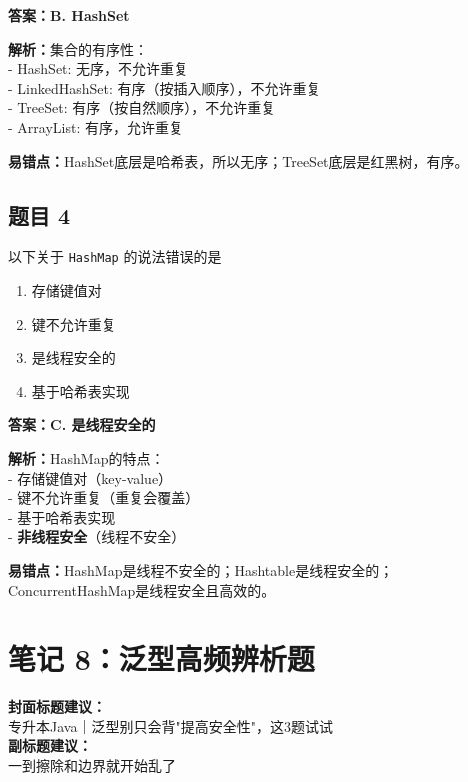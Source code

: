 \documentclass[12pt,a4paper]{ctexart}
\begin{document}
\begin{answerbox}
	\textbf{答案：B. HashSet}

	\textbf{解析：}集合的有序性：\\
	- HashSet: 无序，不允许重复\\
	- LinkedHashSet: 有序（按插入顺序），不允许重复\\
	- TreeSet: 有序（按自然顺序），不允许重复\\
	- ArrayList: 有序，允许重复

	\textbf{易错点：}HashSet底层是哈希表，所以无序；TreeSet底层是红黑树，有序。
\end{answerbox}

\subsection*{题目 4}
以下关于 \texttt{HashMap} 的说法错误的是
\begin{enumerate}[label=\Alph*.]
	\item 存储键值对
	\item 键不允许重复
	\item 是线程安全的
	\item 基于哈希表实现
\end{enumerate}

\begin{answerbox}
	\textbf{答案：C. 是线程安全的}

	\textbf{解析：}HashMap的特点：\\
	- 存储键值对（key-value）\\
	- 键不允许重复（重复会覆盖）\\
	- 基于哈希表实现\\
	- \textbf{非线程安全}（线程不安全）

	\textbf{易错点：}HashMap是线程不安全的；Hashtable是线程安全的；ConcurrentHashMap是线程安全且高效的。
\end{answerbox}

\newpage

\section{笔记 8：泛型高频辨析题}
\begin{coverbox}
	\textbf{封面标题建议：}\\
	专升本Java｜泛型别只会背"提高安全性"，这3题试试\\
	\textbf{副标题建议：}\\
	一到擦除和边界就开始乱了
\end{coverbox}
\end{document}

